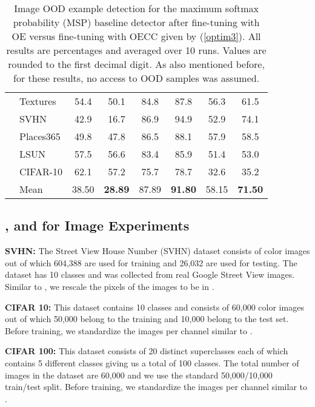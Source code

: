 \documentclass{article} \usepackage{iclr2020_conference,times}
\begin{document}
\begin{table}[h]
\begin{center}
\begin{tabular}{cl|cc|cc|cc}
&Textures  &54.4&50.1&84.8&87.8&56.3&61.5\\
&SVHN      &42.9&16.7&86.9&94.9&52.9&74.1\\
&Places365  &49.8&47.8&86.5&88.1&57.9&58.5\\
&LSUN      &57.5&56.6&83.4&85.9&51.4&53.0\\
&CIFAR-10  &62.1&57.2&75.7&78.7&32.6&35.2\\
\hline
&Mean&38.50&\textbf{28.89}&87.89&\textbf{91.80}&58.15&\textbf{71.50}\\
\bottomrule[1.5pt]
\end{tabular}
\end{center}
\caption{\label{image_table}Image OOD example detection for the maximum softmax probability (MSP) baseline detector after fine-tuning with OE \citep{hendrycks2019oe} versus fine-tuning with OECC given by (\ref{optim3}). All results are percentages and averaged over 10 runs. Values are rounded to the first decimal digit. As also mentioned before, for these results, no access to OOD samples was assumed.}
\end{table}

\subsection{,  and  for Image Experiments}\label{imagedata}
\textbf{SVHN:} The Street View House Number (SVHN) dataset \citep{37648} consists of  color images out of which 604,388 are used for training and 26,032 are used for testing. The dataset has 10 classes and was collected from real Google Street View images. Similar to \citet{hendrycks2019oe}, we rescale the pixels of the images to be in .

\vspace{-5pt}
\textbf{CIFAR 10:} This dataset \citep{Krizhevsky09learningmultiple} contains 10 classes and consists of 60,000  color images out of which 50,000 belong to the training and 10,000 belong to the test set. Before training, we standardize the images per channel similar to \citet{hendrycks2019oe}.
\vspace{-5pt}

\textbf{CIFAR 100:} This dataset \citep{Krizhevsky09learningmultiple} consists of 20 distinct superclasses each of which contains 5 different classes giving us a total of 100 classes. The total number of images in the dataset are 60,000 and we use the standard 50,000/10,000 train/test split. Before training, we standardize the images per channel similar to \citet{hendrycks2019oe}.
\vspace{-5pt}
\end{document}
